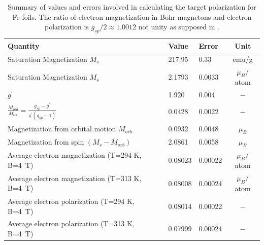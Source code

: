 \documentclass[12pt]{article}
\begin{document}
\begin{table}[h]
\begin{center}
\begin{tabular}{|l|l|l|c|}\hline
Quantity&Value&Error&Unit\\\hline
Saturation Magnetization $M_s$&217.95&0.33&emu/g\\
Saturation Magnetization $M_s$&2.1793&0.0033&$\mu_B/$atom\\
$g^{\prime}$&1.920&0.004&$-$\\
$\frac{M_{orb}}{M_{tot}}=\frac{g_{sp}-g^{\prime}}{g^{\prime}(g_{sp}-1)}$&0.0428&0.0022&$-$\\
Magnetization from orbital motion $M_{orb}$&0.0932&0.0048&$\mu_B$\\
Magnetization from spin $(M_s-M_{orb})$&2.0861&0.0058&$\mu_B$\\
Average electron magnetization (T=294 K, B=4~T)&0.08023&0.00022&$\mu_B/$atom\\
Average electron magnetization (T=313 K, B=4~T)&0.08008&0.00024&$\mu_B/$atom\\
Average electron polarization (T=294 K, B=4~T)&0.08014&0.00022&$-$\\
Average electron polarization (T=313 K, B=4~T)&0.07999&0.00024&$-$\\\hline
\end{tabular}
\end{center}
\caption{\label{tab:final_errors_Fe}Summary of values and errors involved in calculating the target polarization for Fe foils. The ratio of electron magnetization in Bohr magnetons and electron polarization is $g_{sp}/2\approx1.0012$ not unity as supposed in \cite{deBever1997}.}
\end{table}
\end{document}
